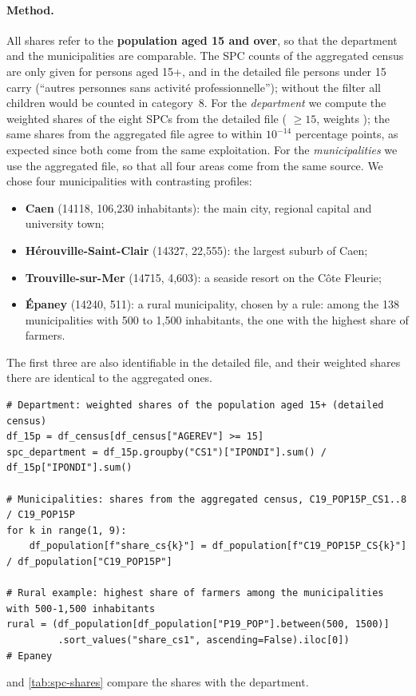 \paragraph{Method.}
All shares refer to the \textbf{population aged 15 and over}, so that the department and the municipalities are
comparable. The SPC counts of the aggregated census are only given for persons aged 15+, and in the detailed file
persons under 15 carry  (``autres personnes sans activit\'e professionnelle''); without the filter all
children would be counted in category~8. For the \emph{department} we compute the weighted shares of the eight SPCs
from the detailed file ( $\geq 15$, weights ); the same shares from the aggregated file agree
to within $10^{-14}$ percentage points, as expected since both come from the same exploitation. For the
\emph{municipalities} we use the aggregated file, so that all four areas come from the same source. We chose four
municipalities with contrasting profiles:
\begin{itemize}
  \item \textbf{Caen} (14118, 106{,}230 inhabitants): the main city, regional capital and university town;
  \item \textbf{H\'erouville-Saint-Clair} (14327, 22{,}555): the largest suburb of Caen;
  \item \textbf{Trouville-sur-Mer} (14715, 4{,}603): a seaside resort on the C\^ote Fleurie;
  \item \textbf{\'Epaney} (14240, 511): a rural municipality, chosen by a rule: among the 138 municipalities with
  500 to 1{,}500 inhabitants, the one with the highest share of farmers.
\end{itemize}
The first three are also identifiable in the detailed file, and their weighted shares there are identical to the
aggregated ones.
\begin{lstlisting}[style=py]
# Department: weighted shares of the population aged 15+ (detailed census)
df_15p = df_census[df_census["AGEREV"] >= 15]
spc_department = df_15p.groupby("CS1")["IPONDI"].sum() / df_15p["IPONDI"].sum()

# Municipalities: shares from the aggregated census, C19_POP15P_CS1..8 / C19_POP15P
for k in range(1, 9):
    df_population[f"share_cs{k}"] = df_population[f"C19_POP15P_CS{k}"] / df_population["C19_POP15P"]

# Rural example: highest share of farmers among the municipalities with 500-1,500 inhabitants
rural = (df_population[df_population["P19_POP"].between(500, 1500)]
         .sort_values("share_cs1", ascending=False).iloc[0])          # Epaney
\end{lstlisting}  and \cref{tab:spc-shares} compare the shares with the department.

